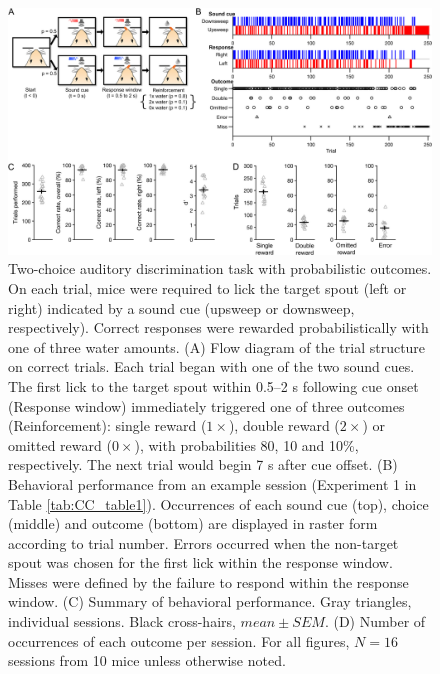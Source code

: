 \begin{figure}[htbp]

\begin{center}
\includegraphics[width=\textwidth]{Figures/Chapter2/CC_fig1} 
\end{center}

\caption[Two-choice auditory discrimination task with probabilistic outcomes]
{Two-choice auditory discrimination task with probabilistic outcomes. On each trial, mice were required to lick the target spout (left or right) indicated by a sound cue (upsweep or downsweep, respectively). Correct responses were rewarded probabilistically with one of three water amounts. (A) Flow diagram of the trial structure on correct trials. Each trial began with one of the two sound cues. The first lick to the target spout within 0.5–2 s following cue onset (Response window) immediately triggered one of three outcomes (Reinforcement): single reward ($1\times$), double reward ($2\times$) or omitted reward ($0\times$), with probabilities 80, 10 and 10\%, respectively. The next trial would begin 7 s after cue offset. (B) Behavioral performance from an example session (Experiment 1 in Table \ref{tab:CC_table1}). Occurrences of each sound cue (top), choice (middle) and outcome (bottom) are displayed in raster form according to trial number. Errors occurred when the non-target spout was chosen for the first lick within the response window. Misses were defined by the failure to respond within the response window. (C) Summary of behavioral performance. Gray triangles, individual sessions. Black cross-hairs, $\mathit{mean}\pm\mathit{SEM}$. (D) Number of occurrences of each outcome per session. For all figures, $N = 16$ sessions from 10 mice unless otherwise noted.}

\label{fig:CC_fig1}
\end{figure}
